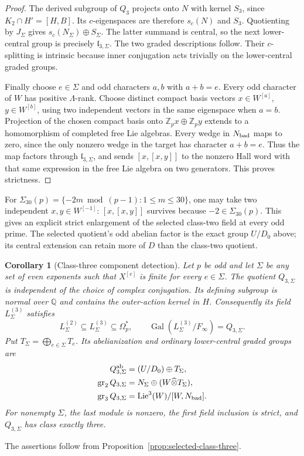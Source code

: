 \documentclass[11pt]{article}
\newtheorem{corollary}[theorem]{Corollary}
\theoremstyle{definition}\newtheorem{definition}[theorem]{Definition}
\begin{document}
\begin{proof}
The derived subgroup of $Q_3$ projects onto $N$ with kernel
$S_3$, since $K_2\cap H'=[H,B]$.  Its $c$-eigenspaces are
therefore $s_c(N)$ and $S_3$.  Quotienting by $J_\Sigma$ gives
$s_c(N_\Sigma)\oplus S_\Sigma$.  The latter summand is central,
so the next lower-central group is precisely $\mathfrak l_{3,\Sigma}$.
The two graded descriptions follow.  Their $c$-splitting is
intrinsic because inner conjugation acts trivially on the
lower-central graded groups.

Finally choose $e\in\Sigma$ and odd characters $a,b$ with
$a+b=e$.  Every odd character of $W$ has positive
$\Lambda$-rank.  Choose distinct compact basis vectors
$x\in W^{[a]}$, $y\in W^{[b]}$, using two independent vectors
in the same eigenspace when $a=b$.  Projection of the chosen compact basis onto $\mathbb Z_p x\oplus\mathbb Z_p y$
extends to a homomorphism of completed free Lie algebras.
Every wedge in $N_{\rm bad}$ maps to zero, since the only
nonzero wedge in the target has character $a+b=e$.
Thus the map factors through $\mathfrak l_{3,\Sigma}$, and sends
$[x,[x,y]]$ to the nonzero Hall word with that same expression
in the free Lie algebra on two generators. This proves strictness.
\end{proof}

For $\Sigma_{30}(p)=\{-2m\bmod(p-1):1\le m\le30\}$,
one may take two independent $x,y\in W^{[-1]}$:
$[x,[x,y]]$ survives because $-2\in\Sigma_{30}(p)$.
This gives an explicit strict enlargement of the selected
class-two field at every odd prime.  The selected quotient's
odd abelian factor is the exact group $U/D_0$ above; its
central extension can retain more of $D$ than the class-two
quotient.

\begin{corollary}[Class-three component detection]
\label{thm:class-three-components}
Let $p$ be odd and let $\Sigma$ be any set of even exponents
such that $X^{[e]}$ is finite for every $e\in\Sigma$.
The quotient $Q_{3,\Sigma}$ is independent of the choice of
complex conjugation. Its defining subgroup is normal over
$\mathbb Q$ and contains the outer-action kernel in $H$.
Consequently its field $L_\Sigma^{(3)}$ satisfies
\[
 L_\Sigma^{(2)}\subseteq L_\Sigma^{(3)}\subseteq\Omega_p^*,
 \qquad \operatorname{Gal}(L_\Sigma^{(3)}/F_\infty)=Q_{3,\Sigma}.
\]
Put $T_\Sigma=\bigoplus_{e\in\Sigma}T_e$.
Its abelianization and ordinary lower-central graded groups are
\begin{align*}
 Q_{3,\Sigma}^{\rm ab}&=(U/D_0)\oplus T_\Sigma,\\
 \operatorname{gr}_2Q_{3,\Sigma}&=N_\Sigma\oplus(W\widehat\otimes T_\Sigma),\\
 \operatorname{gr}_3Q_{3,\Sigma}&=
       \operatorname{Lie}^3(W)/[W,N_{\rm bad}].
\end{align*}
For nonempty $\Sigma$, the last module is nonzero, the first
field inclusion is strict, and $Q_{3,\Sigma}$ has class exactly three.
\end{corollary}
The assertions follow from Proposition~\ref{prop:selected-class-three}.
\end{document}
